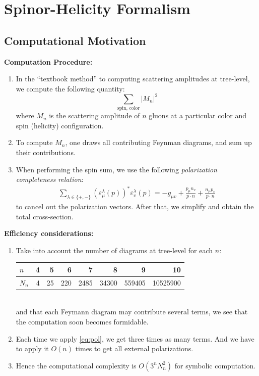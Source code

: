 
\section{Spinor-Helicity Formalism}
\label{sec:spin-helicity-formalism}

\subsection{Computational Motivation}
\label{subsec:computational-motivation}

\textbf{Computation Procedure:}
\begin{enumerate}
    \item 
In the ``textbook method'' to computing scattering amplitudes at tree-level, we compute the following quantity:
\begin{equation}
    \sum_{\text{spin, color}} |M_n|^2
\end{equation}
where $M_n$ is the scattering amplitude of $n$ gluons at a particular color and spin (helicity) configuration.
\item To compute $M_n$, one draws all contributing Feynman diagrams, and sum up their contributions.

\item When performing the spin sum, we use the following \textit{polarization completeness relation}:
\begin{align}
    \label{eq:pol}
\sum_{\lambda \in\{+,-\}}\left(\varepsilon_\mu^\lambda(p)\right)^* \varepsilon_v^\lambda(p)=-g_{\mu v}+\frac{p_\mu n_v}{p \cdot n}+\frac{n_\mu p_v}{p \cdot n}
\end{align}
to cancel out the polarization vectors. After that, we simplify and obtain the total cross-section.
\end{enumerate}


\textbf{Efficiency considerations:}
\begin{enumerate}
    \item 
Take into account the number of diagrams at tree-level for each $n$:

\begin{tabular}{l|rrrrrrr}
$n$ & 4 & 5 & 6 & 7 & 8 & 9 & 10 \\
\hline $N_n$ & 4 & 25 & 220 & 2485 & 34300 & 559405 & 10525900
\end{tabular}\\
and that each Feymann diagram may contribute several terms, we see that the computation soon becomes formidable.

\item Each time we apply \eqref{eq:pol}, we get three times as many terms. And we have to apply it $O(n)$ times to get all external polarizations.

\item Hence the computational complexity is $O(3^n N_n^2)$ for symbolic computation.

\end{enumerate}


